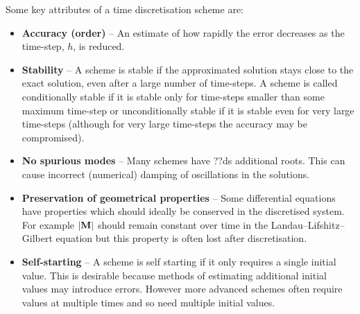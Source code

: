 Some key attributes of a time discretisation scheme are:\cite{Atkinson2009}
\begin{itemize}

\item \textbf{Accuracy (order)} -- An estimate of how rapidly the error decreases as the time-step, $h$, is reduced.

\item \textbf{Stability} -- A scheme is stable if the approximated solution stays close to the exact solution, even after a large number of time-steps. 
A scheme is called conditionally stable if it is stable only for time-steps smaller than some maximum time-step or unconditionally stable if it is stable even for very large time-steps (although for very large time-steps the accuracy may be compromised).


\item \textbf{No spurious modes} -- Many schemes have ??ds additional roots.
This can cause incorrect (numerical) damping of oscillations in the solutions.

\item \textbf{Preservation of geometrical properties} -- Some differential equations have properties which should ideally be conserved in the discretised system. For example $\left|{\mathbf{M}} \right|$ should remain constant over time in the Landau--Lifshitz--Gilbert equation but this property is often lost after discretisation.\cite{DAquino2005}

\item \textbf{Self-starting} -- A scheme is self starting if it only requires a single initial value. This is desirable because methods of estimating additional initial values may introduce errors. However more advanced schemes often require values at multiple times and so need multiple initial values.
\end{itemize}

